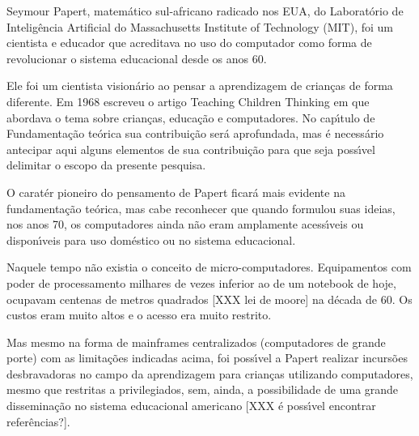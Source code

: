 \documentclass[
12pt,		%
openright,	%
twoside,  %
a4paper,			%
chapter=TITLE,		%
english,			%
french,				%
spanish,			%
brazil				%
]{USPSC-classe/USPSC}
\begin{document}
Seymour Papert, matem\'atico sul-africano radicado nos EUA, do Laborat\'orio de Intelig\^encia Artificial do Massachusetts Institute of Technology (MIT), foi um  cientista e educador que acreditava  no  uso do computador como forma de revolucionar o sistema  educacional  desde os anos 60.














Ele foi um cientista vision\'ario ao pensar a aprendizagem de crian\c{c}as de forma diferente. Em 1968 escreveu o artigo \textquotedbl  Teaching Children Thinking \textquotedbl   em que abordava  o tema sobre crian\c{c}as, educa\c{c}\~ao e computadores. No cap\'{\i}tulo de Fundamenta\c{c}\~ao te\'orica sua contribui\c{c}\~ao ser\'a aprofundada, mas \'e necess\'ario antecipar aqui alguns elementos de sua contribui\c{c}\~ao para que seja poss\'{\i}vel delimitar o escopo da presente pesquisa.














O carat\'er pioneiro do pensamento de Papert ficar\'a mais evidente na fundamenta\c{c}\~ao te\'orica, mas cabe reconhecer que quando formulou suas ideias, nos anos 70, os computadores  ainda n\~ao eram amplamente acess\'{\i}veis ou dispon\'{\i}veis para uso dom\'estico ou no sistema educacional.














Naquele tempo n\~ao existia o conceito de \textquotedbl micro-computadores\textquotedbl . Equipamentos com poder de processamento milhares de vezes inferior ao de um notebook de hoje, ocupavam centenas de metros quadrados [XXX lei de moore] na d\'ecada de 60. Os custos eram muito altos e o acesso era muito restrito.














Mas mesmo na forma de mainframes centralizados (computadores de grande porte) com as limita\c{c}\~oes indicadas acima, foi poss\'{\i}vel a Papert realizar incurs\~oes desbravadoras no campo da aprendizagem para crian\c{c}as utilizando computadores, mesmo que restritas a privilegiados, sem, ainda, a possibilidade de uma grande dissemina\c{c}\~ao no sistema educacional americano [XXX \'e poss\'{\i}vel encontrar refer\^encias?].
\end{document}
